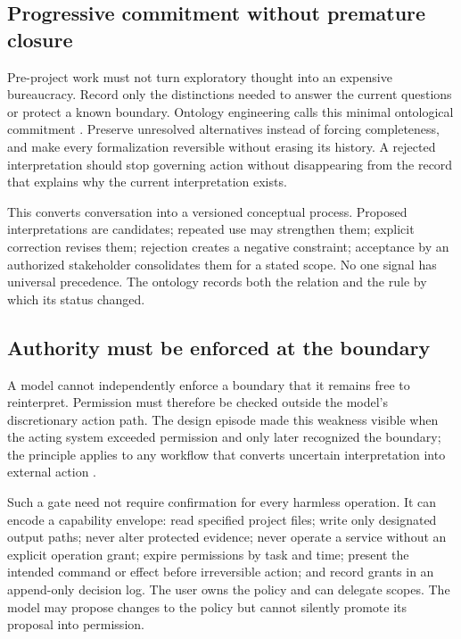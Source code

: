 \documentclass[10pt,a4paper]{article}
\begin{document}
\subsection{Progressive commitment without premature closure}

Pre-project work must not turn exploratory thought into an expensive bureaucracy. Record only the distinctions needed to answer the current questions or protect a known boundary. Ontology engineering calls this minimal ontological commitment \cite{gruber1995}. Preserve unresolved alternatives instead of forcing completeness, and make every formalization reversible without erasing its history. A rejected interpretation should stop governing action without disappearing from the record that explains why the current interpretation exists.

This converts conversation into a versioned conceptual process. Proposed interpretations are candidates; repeated use may strengthen them; explicit correction revises them; rejection creates a negative constraint; acceptance by an authorized stakeholder consolidates them for a stated scope. No one signal has universal precedence. The ontology records both the relation and the rule by which its status changed.

\subsection{Authority must be enforced at the boundary}

A model cannot independently enforce a boundary that it remains free to reinterpret. Permission must therefore be checked outside the model's discretionary action path. The design episode made this weakness visible when the acting system exceeded permission and only later recognized the boundary; the principle applies to any workflow that converts uncertain interpretation into external action \cite{sessionrecord,caseevidence}.

Such a gate need not require confirmation for every harmless operation. It can encode a capability envelope: read specified project files; write only designated output paths; never alter protected evidence; never operate a service without an explicit operation grant; expire permissions by task and time; present the intended command or effect before irreversible action; and record grants in an append-only decision log. The user owns the policy and can delegate scopes. The model may propose changes to the policy but cannot silently promote its proposal into permission.
\end{document}
